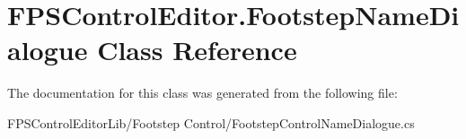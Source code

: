 \hypertarget{class_f_p_s_control_editor_1_1_footstep_name_dialogue}{\section{F\-P\-S\-Control\-Editor.\-Footstep\-Name\-Dialogue Class Reference}
\label{class_f_p_s_control_editor_1_1_footstep_name_dialogue}
}


The documentation for this class was generated from the following file\-:\begin{DoxyCompactItemize}
\item 
F\-P\-S\-Control\-Editor\-Lib/\-Footstep Control/Footstep\-Control\-Name\-Dialogue.\-cs\end{DoxyCompactItemize}
